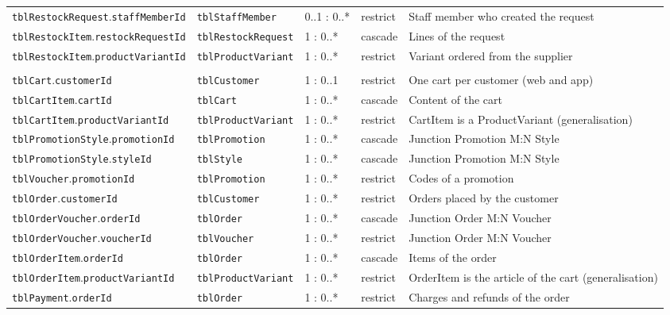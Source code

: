 {\begin{xltabular}{\textwidth}{@{}L{4.0cm} L{3.2cm} L{1.3cm} L{1.2cm} Y@{}}
\texttt{tblRestockRequest}.\allowbreak\texttt{staffMemberId} & \texttt{tblStaffMember} & 0..1 : 0..* & restrict & Staff member who created the request \\
\texttt{tblRestockItem}.\allowbreak\texttt{restockRequestId} & \texttt{tblRestockRequest} & 1 : 0..* & cascade & Lines of the request \\
\texttt{tblRestockItem}.\allowbreak\texttt{productVariantId} & \texttt{tblProductVariant} & 1 : 0..* & restrict & Variant ordered from the supplier \\ \addlinespace
{} \\
\texttt{tblCart}.\allowbreak\texttt{customerId} & \texttt{tblCustomer} & 1 : 0..1 & restrict & One cart per customer (web and app) \\
\texttt{tblCartItem}.\allowbreak\texttt{cartId} & \texttt{tblCart} & 1 : 0..* & cascade & Content of the cart \\
\texttt{tblCartItem}.\allowbreak\texttt{productVariantId} & \texttt{tblProductVariant} & 1 : 0..* & restrict & CartItem is a ProductVariant (generalisation) \\
\texttt{tblPromotionStyle}.\allowbreak\texttt{promotionId} & \texttt{tblPromotion} & 1 : 0..* & cascade & Junction Promotion M:N Style \\
\texttt{tblPromotionStyle}.\allowbreak\texttt{styleId} & \texttt{tblStyle} & 1 : 0..* & cascade & Junction Promotion M:N Style \\
\texttt{tblVoucher}.\allowbreak\texttt{promotionId} & \texttt{tblPromotion} & 1 : 0..* & restrict & Codes of a promotion \\
\texttt{tblOrder}.\allowbreak\texttt{customerId} & \texttt{tblCustomer} & 1 : 0..* & restrict & Orders placed by the customer \\
\texttt{tblOrderVoucher}.\allowbreak\texttt{orderId} & \texttt{tblOrder} & 1 : 0..* & cascade & Junction Order M:N Voucher \\
\texttt{tblOrderVoucher}.\allowbreak\texttt{voucherId} & \texttt{tblVoucher} & 1 : 0..* & restrict & Junction Order M:N Voucher \\
\texttt{tblOrderItem}.\allowbreak\texttt{orderId} & \texttt{tblOrder} & 1 : 0..* & cascade & Items of the order \\
\texttt{tblOrderItem}.\allowbreak\texttt{productVariantId} & \texttt{tblProductVariant} & 1 : 0..* & restrict & OrderItem is the article of the cart (generalisation) \\
\texttt{tblPayment}.\allowbreak\texttt{orderId} & \texttt{tblOrder} & 1 : 0..* & restrict & Charges and refunds of the order \\

\end{xltabular}}
